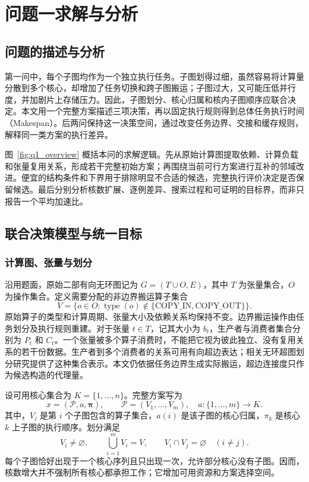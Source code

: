 \section{问题一求解与分析}
\label{sec:q1}
\subsection{问题的描述与分析}
第一问中，每个子图均作为一个独立执行任务。子图划得过细，虽然容易将计算量分散到多个核心，却增加了任务切换和跨子图搬运；子图过大，又可能压低并行度，并加剧片上存储压力。因此，子图划分、核心归属和核内子图顺序应联合决定。本文用一个完整方案描述三项决策，再以固定执行规则得到总体任务执行时间（Makespan）。后两问保持这一决策空间，通过改变任务边界、交接和缓存规则，解释同一类方案的执行差异。

图~\ref{fig:q1_overview} 概括本问的求解逻辑。先从原始计算图提取依赖、计算负载和张量复用关系，形成若干完整初始方案；再围绕当前可行方案进行互补的邻域改进。便宜的结构条件和下界用于排除明显不合适的候选，完整执行评价决定是否保留候选。最后分别分析核数扩展、逐例差异、搜索过程和可证明的目标界，而非只报告一个平均加速比。


\subsection{联合决策模型与统一目标}
\subsubsection{计算图、张量与划分}
沿用题面，原始二部有向无环图记为 $G=(T\cup O,E)$，其中 $T$ 为张量集合，$O$ 为操作集合。定义需要分配的非边界搬运算子集合
\begin{equation}
 V=\{o\in O:\operatorname{type}(o)\notin\{\mathrm{COPY\_IN},\mathrm{COPY\_OUT}\}\}.
\end{equation}
原始算子的类型和计算周期、张量大小及依赖关系均保持不变。边界搬运操作由任务划分及执行规则重建。对于张量 $t\in T$，记其大小为 $b_t$，生产者与消费者集合分别为 $P_t$ 和 $C_t$。一个张量被多个算子消费时，不能把它视为彼此独立、没有复用关系的若干份数据。生产者到多个消费者的关系可用有向超边表达；相关无环超图划分研究提供了这种集合表示\cite{A39}。本文仍依据任务边界生成实际搬运，超边连接度只作为候选构造的代理量。

设可用核心集合为 $K=\{1,\ldots,n\}$。完整方案写为
\begin{equation}
 x=(\mathcal P,a,\boldsymbol\pi),\qquad
 \mathcal P=(V_1,\ldots,V_m),\quad a:\{1,\ldots,m\}\longrightarrow K .
 \label{eq:plan}
\end{equation}
其中，$V_i$ 是第 $i$ 个子图包含的算子集合，$a(i)$ 是该子图的核心归属，$\pi_k$ 是核心 $k$ 上子图的执行顺序。划分满足
\begin{equation}
 V_i\ne\varnothing,\qquad \bigcup_{i=1}^{m}V_i=V,\qquad
 V_i\cap V_j=\varnothing\quad(i\ne j).
 \label{eq:partition}
\end{equation}
每个子图恰好出现于一个核心序列且只出现一次，允许部分核心没有子图。因而，核数增大并不强制所有核心都承担工作；它增加可用资源和方案选择空间。

